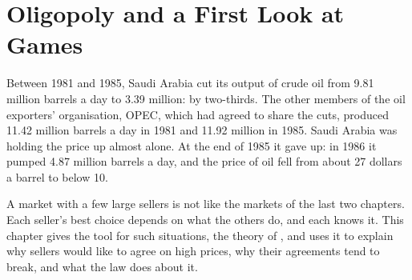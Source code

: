 \chapter{Oligopoly and a First Look at Games}\label{ch:g11:oligopoly-and-games}

Between 1981 and 1985, Saudi Arabia cut its output of crude oil from 9.81 million barrels a day to 3.39 million: by two-thirds. The other
members of the oil exporters' organisation, OPEC, which had agreed to share the cuts, produced 11.42 million barrels a day in 1981 and 11.92
million in 1985. Saudi Arabia was holding the price up almost alone. At the end of 1985 it gave up: in 1986 it pumped 4.87 million barrels a day,
and the price of oil fell from about 27 dollars a barrel to below 10.

A market with a few large sellers is not like the markets of the last two chapters. Each seller's best choice depends on what the others do, and
each knows it. This chapter gives the tool for such situations, the theory of , and uses it to explain why sellers would like to agree on high
prices, why their agreements tend to break, and what the law does about it.

